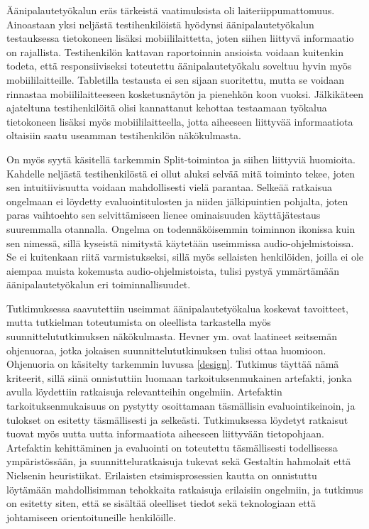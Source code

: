 \documentclass[utf8]{gradu3}
\begin{document}
Äänipalautetyökalun eräs tärkeistä vaatimuksista oli laiteriippumattomuus. Ainoastaan yksi neljästä testihenkilöistä hyödynsi äänipalautetyökalun testauksessa tietokoneen lisäksi mobiililaittetta, joten siihen liittyvä informaatio on rajallista. Testihenkilön kattavan raportoinnin ansioista voidaan kuitenkin todeta, että responsiiviseksi toteutettu äänipalautetyökalu soveltuu hyvin myös mobiililaitteille. Tabletilla testausta ei sen sijaan suoritettu, mutta se voidaan rinnastaa mobiililaitteeseen kosketusnäytön ja pienehkön koon vuoksi. Jälkikäteen ajateltuna testihenkilöitä olisi kannattanut kehottaa testaamaan työkalua tietokoneen lisäksi myös mobiililaitteella, jotta aiheeseen liittyvää informaatiota oltaisiin saatu useamman testihenkilön näkökulmasta.

On myös syytä käsitellä tarkemmin Split-toimintoa ja siihen liittyviä huomioita. Kahdelle neljästä testihenkilöstä ei ollut aluksi selvää mitä toiminto tekee, joten sen intuitiivisuutta voidaan mahdollisesti vielä parantaa. Selkeää ratkaisua ongelmaan ei löydetty evaluointitulosten ja niiden jälkipuintien pohjalta, joten paras vaihtoehto sen selvittämiseen lienee ominaisuuden käyttäjätestaus suuremmalla otannalla. Ongelma on todennäköisemmin toiminnon ikonissa kuin sen nimessä, sillä kyseistä nimitystä käytetään useimmissa audio-ohjelmistoissa. Se ei kuitenkaan riitä varmistukseksi, sillä myös sellaisten henkilöiden, joilla ei ole aiempaa muista kokemusta audio-ohjelmistoista, tulisi pystyä ymmärtämään äänipalautetyökalun eri toiminnallisuudet.

Tutkimuksessa saavutettiin useimmat äänipalautetyökalua koskevat tavoitteet, mutta tutkielman toteutumista on oleellista tarkastella myös suunnittelututkimuksen näkökulmasta. Hevner ym. \parencite*{hevner2004} ovat laatineet seitsemän ohjenuoraa, jotka jokaisen suunnittelututkimuksen tulisi ottaa huomioon. Ohjenuoria on käsitelty tarkemmin luvussa \ref{design}. Tutkimus täyttää nämä kriteerit, sillä siinä onnistuttiin luomaan tarkoituksenmukainen artefakti, jonka avulla löydettiin ratkaisuja relevantteihin ongelmiin. Artefaktin tarkoituksenmukaisuus on pystytty osoittamaan täsmällisin evaluointikeinoin, ja tulokset on esitetty täsmällisesti ja selkeästi. Tutkimuksessa löydetyt ratkaisut tuovat myös uutta uutta informaatiota aiheeseen liittyvään tietopohjaan. Artefaktin kehittäminen ja evaluointi on toteutettu täsmällisesti todellisessa ympäristössään, ja suunnitteluratkaisuja tukevat sekä Gestaltin hahmolait että Nielsenin heuristiikat. Erilaisten etsimisprosessien kautta on onnistuttu löytämään mahdollisimman tehokkaita ratkaisuja erilaisiin ongelmiin, ja tutkimus on esitetty siten, että se sisältää oleelliset tiedot sekä teknologiaan että johtamiseen orientoituneille henkilöille. 
\end{document}
